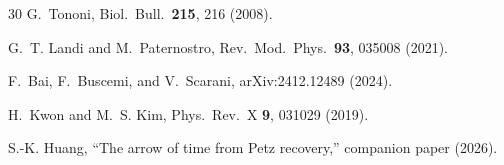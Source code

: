 \documentclass[prl,twocolumn,superscriptaddress,longbibliography,floatfix]{revtex4-2}
\begin{document}
\begin{thebibliography}{30}
G.~Tononi,
Biol.\ Bull.\ \textbf{215}, 216 (2008).

G.~T. Landi and M.~Paternostro,
Rev.\ Mod.\ Phys.\ \textbf{93}, 035008 (2021).

F.~Bai, F.~Buscemi, and V.~Scarani,
arXiv:2412.12489 (2024).

H.~Kwon and M.~S. Kim,
Phys.\ Rev.\ X \textbf{9}, 031029 (2019).

S.-K. Huang,
``The arrow of time from Petz recovery,''
companion paper (2026).

\end{thebibliography}
\end{document}
